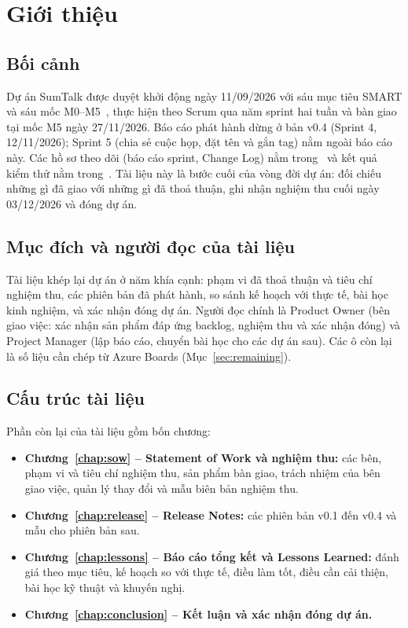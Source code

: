 \documentclass[12pt,a4paper]{report}
\begin{document}
\cleardoublepage{}
{}
\listoffigures

\cleardoublepage{}
{}
\listoftables

\chapter{Giới thiệu}
\label{chap:intro}

\section{Bối cảnh}

Dự án SumTalk được duyệt khởi động ngày 11/09/2026 với sáu mục tiêu SMART và sáu mốc M0--M5~\cite{pid}, thực hiện
theo Scrum qua năm sprint hai tuần và bàn giao tại mốc M5 ngày 27/11/2026. Báo cáo phát hành dừng ở bản v0.4
(Sprint 4, 12/11/2026); Sprint 5 (chia sẻ cuộc họp, đặt tên và gắn tag) nằm ngoài báo cáo này. Các hồ sơ theo dõi
(báo cáo sprint, Change Log) nằm trong~\cite{mcr} và kết quả kiểm thử nằm trong~\cite{qtd}. Tài liệu này là bước
cuối của vòng đời dự án: đối chiếu những gì đã giao với những gì đã thoả thuận, ghi nhận nghiệm thu cuối ngày
03/12/2026 và đóng dự án.

\section{Mục đích và người đọc của tài liệu}

Tài liệu khép lại dự án ở năm khía cạnh: phạm vi đã thoả thuận và tiêu chí nghiệm thu, các phiên bản đã phát hành,
so sánh kế hoạch với thực tế, bài học kinh nghiệm, và xác nhận đóng dự án. Người đọc chính là Product Owner (bên
giao việc: xác nhận sản phẩm đáp ứng backlog, nghiệm thu và xác nhận đóng) và Project Manager (lập báo cáo, chuyển
bài học cho các dự án sau). Các ô \canDien{} còn lại là số liệu cần chép từ Azure Boards (Mục~\ref{sec:remaining}).

\section{Cấu trúc tài liệu}

Phần còn lại của tài liệu gồm bốn chương:
\begin{itemize}
  \item \textbf{Chương~\ref{chap:sow} -- Statement of Work và nghiệm thu:} các bên, phạm vi và tiêu chí nghiệm thu,
        sản phẩm bàn giao, trách nhiệm của bên giao việc, quản lý thay đổi và mẫu biên bản nghiệm thu.
  \item \textbf{Chương~\ref{chap:release} -- Release Notes:} các phiên bản v0.1 đến v0.4 và mẫu cho phiên bản sau.
  \item \textbf{Chương~\ref{chap:lessons} -- Báo cáo tổng kết và Lessons Learned:} đánh giá theo mục tiêu, kế hoạch so
        với thực tế, điều làm tốt, điều cần cải thiện, bài học kỹ thuật và khuyến nghị.
  \item \textbf{Chương~\ref{chap:conclusion} -- Kết luận và xác nhận đóng dự án.}
\end{itemize}
\end{document}
